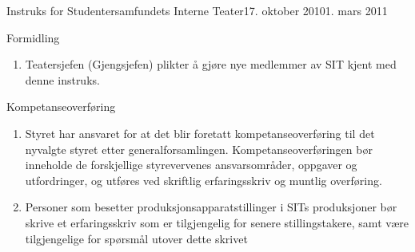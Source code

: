 \documentclass[../fsbok.tex]{subfiles}
\begin{document}
\begin{instruks}{Instruks for Studentersamfundets Interne Teater}{17. oktober 2010}{1. mars 2011 }
	\begin{instruksledd}{Formidling}
		\begin{enumerate}
			\item Teatersjefen (Gjengsjefen) plikter å gjøre nye medlemmer av SIT kjent med
				denne instruks.
		\end{enumerate}
	\end{instruksledd}

	\begin{instruksledd}{Kompetanseoverføring}
		\begin{enumerate}
			\item Styret har ansvaret for at det blir foretatt kompetanseoverføring til det
				nyvalgte styret etter generalforsamlingen. Kompetanseoverføringen bør inneholde de forskjellige
				styrevervenes ansvarsområder, oppgaver og utfordringer, og utføres ved skriftlig erfaringsskriv og
				muntlig overføring.
			\item Personer som besetter produksjonsapparatstillinger i SITs produksjoner bør
				skrive et erfaringsskriv som er tilgjengelig for senere stillingstakere, samt være tilgjengelige for
				spørsmål utover dette skrivet	
		\end{enumerate}
	\end{instruksledd}


\end{instruks}
\end{document}
